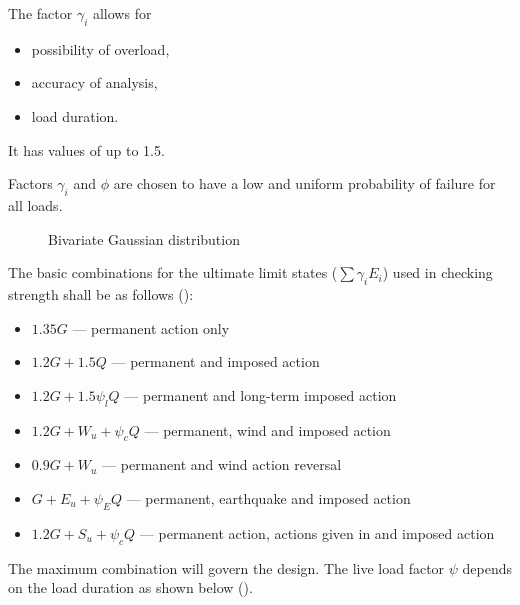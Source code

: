 The factor $\gamma_i$ allows for
\begin{itemize}
\item possibility of overload,
\item accuracy of analysis,
\item load duration.
\end{itemize}
It has values of up to \num{1.5}.

Factors $\gamma_i$ and $\phi$ are chosen to have a low and uniform probability of failure for all loads.
\begin{figure}[H]
\centering

\caption{Bivariate Gaussian distribution}
\end{figure}

The basic combinations for the ultimate limit states ($\displaystyle\sum\gamma_iE_i$) used in checking strength shall be as follows ():
\begin{itemize}
\item $1.35G$ --- permanent action only
\item $1.2G+1.5Q$ --- permanent and imposed action
\item $1.2G+1.5\psi_lQ$ --- permanent and long-term imposed action
\item $1.2G+W_u+\psi_cQ$ --- permanent, wind and imposed action
\item $0.9G+W_u$ --- permanent and wind action reversal
\item $G+E_u+\psi_EQ$ --- permanent, earthquake and imposed action
\item $1.2G+S_u+\psi_cQ$ --- permanent action, actions given in  and imposed action
\end{itemize}
The maximum combination will govern the design.
The live load factor $\psi$ depends on the load duration as shown below ().
